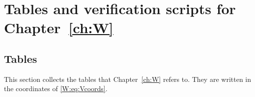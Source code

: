 \chapter[Tables and verification scripts]{Tables and verification scripts for \texorpdfstring{Chapter~\ref{ch:W}}{Chapter 8}}\label{ch:scripts}
\begingroup
\providecommand{\F}{}\renewcommand{\F}{F}
\providecommand{\Z}{}\renewcommand{\Z}{\mathbb Z}
\providecommand{\C}{}\renewcommand{\C}{\mathbb C}
\providecommand{\Q}{}\renewcommand{\Q}{\mathbb Q}
\providecommand{\Fq}{}\renewcommand{\Fq}{\mathbb F}
\providecommand{\Nm}{}\renewcommand{\Nm}{\operatorname N}
\providecommand{\Nrd}{}\renewcommand{\Nrd}{\operatorname{Nrd}}
\providecommand{\Trd}{}\renewcommand{\Trd}{\operatorname{Trd}}
\providecommand{\Tr}{}\renewcommand{\Tr}{\operatorname{Tr}}
\providecommand{\Irr}{}\renewcommand{\Irr}{\operatorname{Irr}}
\providecommand{\Ind}{}\renewcommand{\Ind}{\operatorname{Ind}}
\providecommand{\Ad}{}\renewcommand{\Ad}{\operatorname{Ad}}
\providecommand{\tH}{}\renewcommand{\tH}{\widetilde H}
\providecommand{\tZ}{}\renewcommand{\tZ}{\widetilde Z}
\providecommand{\tU}{}\renewcommand{\tU}{\widetilde U}
\providecommand{\tV}{}\renewcommand{\tV}{\widetilde V}
\providecommand{\tth}{}\renewcommand{\tth}{\widetilde\theta}
\providecommand{\Ocal}{}\renewcommand{\Ocal}{\mathcal O}
\providecommand{\Pfr}{}\renewcommand{\Pfr}{\mathfrak P}
\providecommand{\pfr}{}\renewcommand{\pfr}{\mathfrak p}
\providecommand{\Reg}{}\renewcommand{\Reg}{\operatorname{Reg}}
\providecommand{\Heis}{}\renewcommand{\Heis}{\mathrm{Heis}}
\providecommand{\Cubes}{}\renewcommand{\Cubes}{\mathrm{Cubes}}
\providecommand{\Good}{}\renewcommand{\Good}{\mathrm{Good}}
\providecommand{\Ptag}{}\renewcommand{\Ptag}{\textnormal{\textbf{(P)}}}
\providecommand{\Pctag}{}\renewcommand{\Pctag}{\textnormal{\textbf{(P$^{\mathrm c}$)}}}
\providecommand{\Etag}{}\renewcommand{\Etag}{\textnormal{\textbf{(E)}}}
\providecommand{\Otag}{}\renewcommand{\Otag}{\textnormal{\textbf{(O)}}}
\providecommand{\Ctag}{}\renewcommand{\Ctag}{\textnormal{\textbf{(C)}}}
\section{Tables}\label{W:app:tables}
This section collects the tables that Chapter~\ref{ch:W} refers to. They are written in the coordinates of \eqref{W:eq:Vcoords}.

